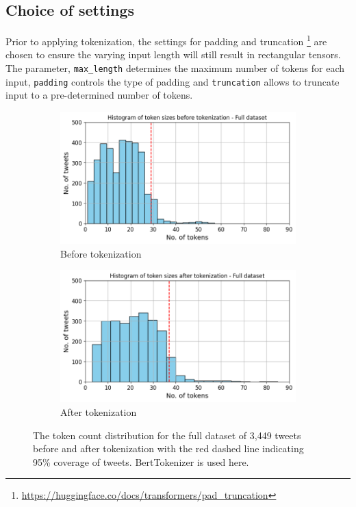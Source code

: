 \subsection{Choice of settings}
Prior to applying tokenization, the settings for padding and truncation \footnote{\url{https://huggingface.co/docs/transformers/pad_truncation}} are chosen to ensure the varying input length will still result in rectangular tensors. The parameter, \texttt{max\_length} determines the maximum number of tokens for each input, \texttt{padding} controls the type of padding and \texttt{truncation} allows to truncate input to a pre-determined number of tokens.\newline

\begin{figure}[htbp]
    \centering
    \captionsetup{font=small}
    \begin{subfigure}[b]{0.48\textwidth}
        \includegraphics[width=\textwidth]{figures/token_hist.png}
        \caption{Before tokenization}
        \label{fig: token_hist}
    \end{subfigure}
    \hfill
    \begin{subfigure}[b]{0.48\textwidth}
        \includegraphics[width=\textwidth]{figures/token_pp_hist.png}
        \caption{After tokenization}
        \label{fig: token_pp_hist}
    \end{subfigure}
    \caption{The token count distribution for the full dataset of 3,449 tweets before and after tokenization with the red dashed line indicating 95\% coverage of tweets. BertTokenizer is used here.}
    \label{fig: bef_aft_token}
\end{figure}

